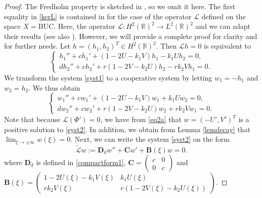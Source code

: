 \documentclass[11pt]{article}
\numberwithin{equation}{section}
\newcommand{\1}{\mathbbm{1}}
\numberwithin{equation}{section}
\theoremstyle{definition}
\def \dis {\displaystyle}
\def \R {\mathbb{R}}
\def \B {\mathbf{B}}
\def \C {\mathbf{C}}
\def \D {\mathbf{D}}
\def \L {\mathcal{L}}
\def \BUC{\mathrm{BUC}}
\numberwithin{equation}{section}
\def \dis {\displaystyle}
\begin{document}
\begin{proof}
The Fredholm property is sketched in \cite{kenne2026}, so we omit it here.
The first equality in \eqref{kerL} is contained in  \cite[Lemma 3.3]{kan1996} for the case of the operator $\L$ defined on the space $X=\BUC$. Here, the operator $\L: H^2(\R)^2 \to L^2(\R)^2$ and we can adapt their results (see also \cite{risler2017}).  However, we will provide a complete proof for clarity and for further needs. 
Let $h=(h_1,h_2)^T\in H^2(\R)^2$. Then $\L h=0$ is equivalent to 
\begin{equation}\label{syst1}
\left\{ 
	\begin{array}{llllll}
	h_1''+ch_1'+(1-2U-k_1V)h_1-k_1Uh_2=0,\\
	dh_2''+ch_2'+r(1-2V-k_2U)h_2-rk_2Vh_1=0.
	\end{array} 
	\right.
\end{equation}
We transform the system \eqref{syst1} to a cooperative system by letting $w_1=-h_1$ and $w_2=h_2$. We thus obtain 
\begin{equation}\label{syst2}
	\left\{ 
	\begin{array}{llllll}
		w_1''+cw_1'+(1-2U-k_1V)w_1+k_1Uw_2=0,\\
		dw_2''+cw_2'+r(1-2V-k_2U)w_2+rk_2Vw_1=0.
	\end{array} 
	\right.
\end{equation}
Note that because $\L(\Phi')=0$, we have from \eqref{eq2a} that $w=(-U',V')^T$ is a positive solution to \eqref{syst2}. In addition, we obtain from Lemma \ref{lemdecay} that $\dis \lim_{\xi\to \pm\infty}w(\xi)=0$. Next, we can write the system \eqref{syst2} on the form
\begin{equation}\label{compact00}
\tilde{\L}w:=\D_dw''+\C w'+\B(\xi)w=0.
\end{equation} 
where $\D_d$ is defined in \eqref{compactform1}, $\C= \begin{pmatrix}c&0\\0&c\end{pmatrix}$ and $\B(\xi)=\begin{pmatrix}
	1-2U(\xi)-k_1V(\xi) & k_1U(\xi) \\
	rk_2V(\xi)& r(1-2V(\xi)-k_2U(\xi))
\end{pmatrix}.$ 

\end{proof}
\end{document}
